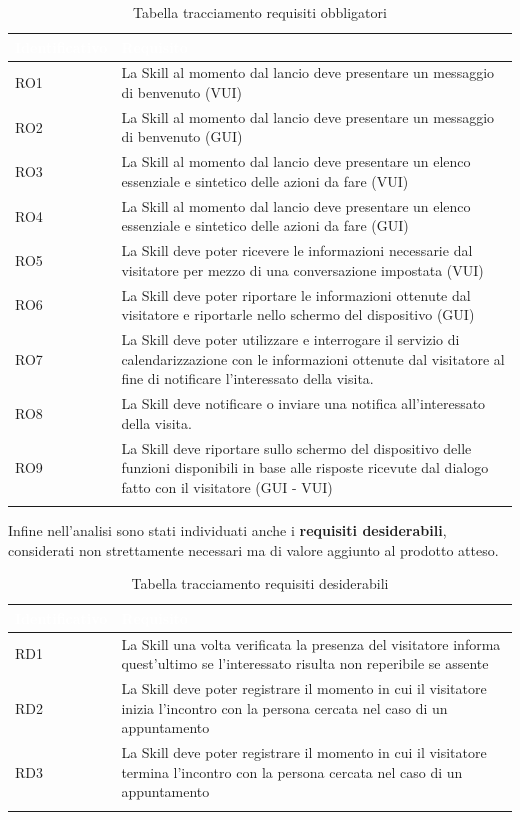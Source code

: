 \begin{center}
	\centering
	\renewcommand{\arraystretch}{1.5}
	\begin{longtable}{  p{2.5cm} p{9.8cm} }
		\rowcolor{tableHead}
		\textbf{\textcolor{white}{Identificativo}} & \textbf{\textcolor{white}{Requisito}} \\
		\endhead  
		RO1 & La Skill al momento dal lancio deve presentare un messaggio di benvenuto (VUI) \\
		RO2 & La Skill al momento dal lancio deve presentare un messaggio di benvenuto (GUI) \\
		RO3 & La Skill al momento dal lancio deve presentare un elenco essenziale e sintetico delle azioni da fare (VUI) \\ 
		RO4 & La Skill al momento dal lancio deve presentare un elenco essenziale e sintetico delle azioni da fare  (GUI) \\
		RO5 & La Skill deve poter ricevere le informazioni necessarie dal visitatore per mezzo di una conversazione impostata (VUI)  \\
		RO6 & La Skill deve poter riportare le informazioni ottenute dal visitatore e riportarle nello schermo del dispositivo (GUI) \\
		RO7\label{RO7} & La Skill deve poter utilizzare e interrogare il servizio di calendarizzazione con le informazioni ottenute dal visitatore al fine di notificare l'interessato della visita.\\
		RO8\label{RO8} & La Skill deve notificare o inviare una notifica all'interessato della visita.\\
		RO9 & La Skill deve riportare sullo schermo del dispositivo delle funzioni disponibili in base alle risposte ricevute dal dialogo fatto con il visitatore (GUI - VUI)\\
		\rowcolor{white}
		\caption{Tabella tracciamento requisiti obbligatori}
	\end{longtable}
\end{center}
Infine nell'analisi sono stati individuati anche i \textbf{requisiti desiderabili}, considerati non strettamente necessari ma di valore aggiunto al prodotto atteso.
\begin{center}
	\centering
	\renewcommand{\arraystretch}{1.5}
	\begin{longtable}{  p{2.5cm} p{9.8cm} }
		\rowcolor{tableHead}
		\textbf{\textcolor{white}{Identificativo}} & \textbf{\textcolor{white}{Requisito}} \\
		\endhead  
		RD1 & La Skill una volta verificata la presenza del visitatore informa quest'ultimo se l'interessato risulta non reperibile se assente \\
		RD2 & La Skill deve poter registrare il momento in cui il visitatore inizia l'incontro con la persona cercata nel caso di un appuntamento \\
		RD3 & La Skill deve poter registrare il momento in cui il visitatore termina l'incontro con la persona cercata nel caso di un appuntamento \\
		\rowcolor{white}
		\caption{Tabella tracciamento requisiti desiderabili}
	\end{longtable}
\end{center}
